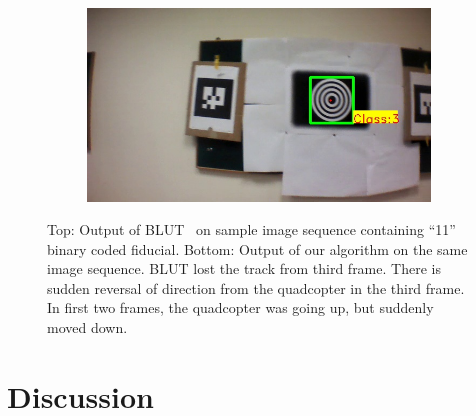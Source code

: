 \documentclass[10pt,twocolumn,letterpaper]{article}
\begin{document}
\begin{figure}
\begin{subfigure}[b]{.19\textwidth}
\end{subfigure}
\begin{subfigure}[b]{.19\textwidth}
\includegraphics[width=\linewidth]{BLUT_input_11/output6.jpg}
\end{subfigure}
\caption{Top: Output of BLUT~\cite{Wu:2011} on sample image sequence containing
``11'' binary coded fiducial. Bottom: Output of our algorithm on the same image
sequence. BLUT lost the track from third frame. There is sudden reversal of
direction from the quadcopter in the third frame. In first two frames, the quadcopter was
going up, but suddenly moved down.}
\label{fig:BLUT_compare_11}
\end{figure}

\section{Discussion}\label{sec:discussion}
\end{document}
